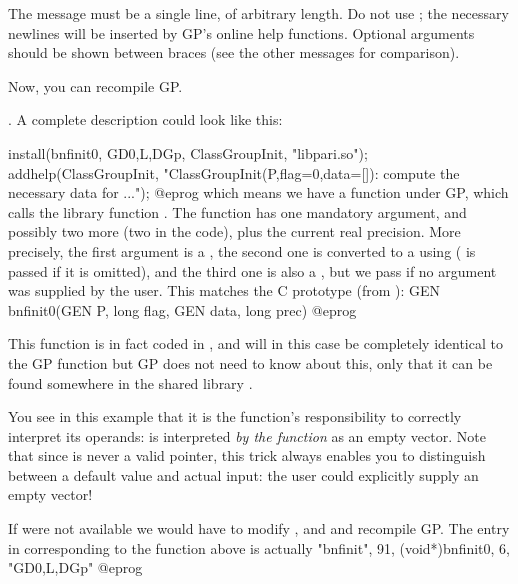 The message must be a single line, of arbitrary length. Do not use
; the necessary newlines will be inserted by GP's online help
functions. Optional arguments should be shown between braces (see the other
messages for comparison).\smallskip

Now, you can recompile GP.

.
%
A complete description could look like this:

\bprog
{
  install(bnfinit0, GD0,L,DGp, ClassGroupInit, "libpari.so");
  addhelp(ClassGroupInit, "ClassGroupInit(P,{flag=0},{data=[]}):
    compute the necessary data for ...");
}
@eprog
which means we have a function  under GP, which calls
the library function  . The function has one mandatory
argument, and possibly two more (two  in the code), plus the
current real precision. More precisely, the first argument is a ,
the second one is converted to a  using  ( is
passed if it is omitted), and the third one is also a , but we
pass  if no argument was supplied by the user. This matches the C
prototype (from ):
%
\bprog
  GEN bnfinit0(GEN P, long flag, GEN data, long prec)
@eprog

This function is in fact coded in , and will in this
case be completely identical to the GP function  but GP does
not need to know about this, only that it can be found somewhere in the
shared library .

 You see in this example that it is the
function's responsibility to correctly interpret its operands:  is interpreted \emph{by the function} as an empty vector. Note that
since  is never a valid  pointer, this trick always
enables you to distinguish between a default value and actual input: the
user could explicitly supply an empty vector!

 If  were not available we would have to
modify , and  and
recompile GP. The entry in  corresponding to the
function above is actually
\bprog
{ "bnfinit", 91, (void*)bnfinit0, 6, "GD0,L,DGp" }
@eprog
\vfill\eject
